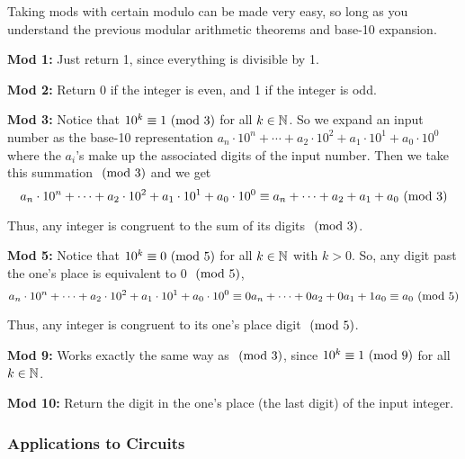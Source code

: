 \documentclass[main.tex]{subfiles}
\begin{document}
Taking mods with certain modulo can be made very easy, so long as you understand the previous modular arithmetic theorems and base-10 expansion.

\begin{boxx}
	\textbf{Mod 1:} Just return 1, since everything is divisible by 1.
\end{boxx}

\begin{boxx}
	\textbf{Mod 2:} Return 0 if the integer is even, and 1 if the integer is odd.
\end{boxx}

\begin{boxx}
	\textbf{Mod 3:} Notice that \(10^k \equiv 1 \ (\mathrm{mod}\ 3)\) for all \(k \in \mathbb{N}\). So we expand an input number as the base-10 representation \(a_n \cdot 10^n + \cdots + a_2 \cdot 10^2 + a_1 \cdot 10^1 + a_0 \cdot 10^0\) where the \(a_i\)'s make up the associated digits of the input number. Then we take this summation \(\ (\mathrm{mod}\ 3)\) and we get \[a_n \cdot 10^n + \cdots + a_2 \cdot 10^2 + a_1 \cdot 10^1 + a_0 \cdot 10^0 \equiv a_n + \cdots + a_2 + a_1 + a_0 \ (\mathrm{mod}\ 3)\]
	
	Thus, any integer is congruent to the sum of its digits \(\ (\mathrm{mod}\ 3)\).
\end{boxx}

\begin{boxx}
	\textbf{Mod 5:} Notice that \(10^k \equiv 0 \ (\mathrm{mod}\ 5)\) for all \(k \in \mathbb{N}\) with \(k > 0\). So, any digit past the one's place is equivalent to 0 \(\ (\mathrm{mod}\ 5)\), \[a_n \cdot 10^n + \cdots + a_2 \cdot 10^2 + a_1 \cdot 10^1 + a_0 \cdot 10^0 \equiv 0a_n + \cdots + 0a_2 + 0a_1 + 1a_0 \equiv a_0 \ (\mathrm{mod}\ 5)\]
	
	Thus, any integer is congruent to its one's place digit \(\ (\mathrm{mod}\ 5)\).
\end{boxx}

\begin{boxx}
	\textbf{Mod 9:} Works exactly the same way as \(\ (\mathrm{mod}\ 3)\), since \(10^k \equiv 1 \ (\mathrm{mod}\ 9)\) for all \(k \in \mathbb{N}\).
\end{boxx}

\begin{boxx}
	\textbf{Mod 10:} Return the digit in the one's place (the last digit) of the input integer.
\end{boxx}

\subsubsection{Applications to Circuits}
\end{document}
